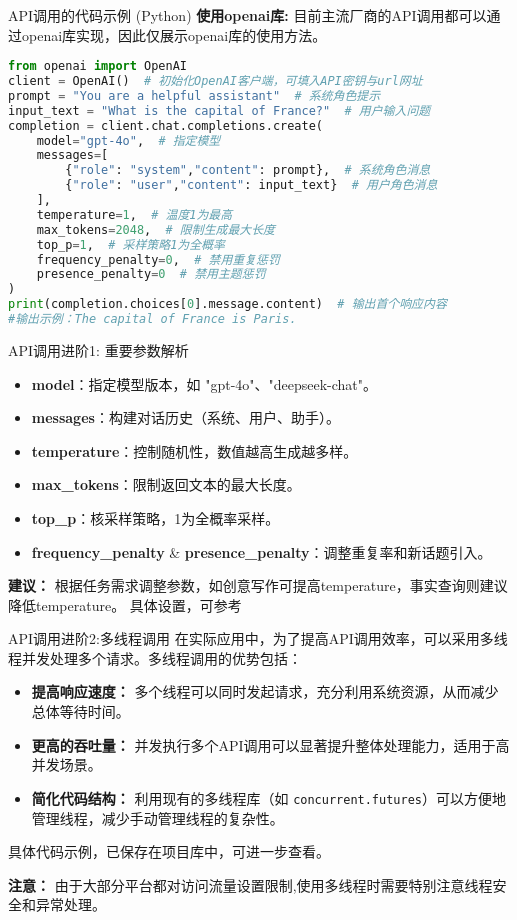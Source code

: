 \documentclass{beamer}
\begin{document}
\begin{frame}[fragile]{API调用的代码示例 (Python)}
    \scriptsize
\textbf{使用openai库:} 目前主流厂商的API调用都可以通过openai库实现，因此仅展示openai库的使用方法。

\begin{lstlisting}[language={Python}]
from openai import OpenAI  
client = OpenAI()  # 初始化OpenAI客户端，可填入API密钥与url网址
prompt = "You are a helpful assistant"  # 系统角色提示
input_text = "What is the capital of France?"  # 用户输入问题
completion = client.chat.completions.create(
    model="gpt-4o",  # 指定模型
    messages=[ 
        {"role": "system","content": prompt},  # 系统角色消息
        {"role": "user","content": input_text}  # 用户角色消息
    ],
    temperature=1,  # 温度1为最高
    max_tokens=2048,  # 限制生成最大长度
    top_p=1,  # 采样策略1为全概率
    frequency_penalty=0,  # 禁用重复惩罚
    presence_penalty=0  # 禁用主题惩罚
)
print(completion.choices[0].message.content)  # 输出首个响应内容
#输出示例：The capital of France is Paris.
\end{lstlisting}
\end{frame}

\begin{frame}[fragile]{API调用进阶1: 重要参数解析}
    \begin{itemize}
        \item \textbf{model}：指定模型版本，如 "gpt-4o"、"deepseek-chat"。
        \item \textbf{messages}：构建对话历史（系统、用户、助手）。
        \item \textbf{temperature}：控制随机性，数值越高生成越多样。
        \item \textbf{max\_tokens}：限制返回文本的最大长度。
        \item \textbf{top\_p}：核采样策略，1为全概率采样。
        \item \textbf{frequency\_penalty} \& \textbf{presence\_penalty}：调整重复率和新话题引入。
    \end{itemize}
    \medskip
    \textbf{建议：} 根据任务需求调整参数，如创意写作可提高temperature，事实查询则建议降低temperature。
    具体设置，可参考
\end{frame}

\begin{frame}[fragile]{API调用进阶2:多线程调用}
\small
    在实际应用中，为了提高API调用效率，可以采用多线程并发处理多个请求。多线程调用的优势包括：
    \begin{itemize}
        \item \textbf{提高响应速度：} 多个线程可以同时发起请求，充分利用系统资源，从而减少总体等待时间。
        \item \textbf{更高的吞吐量：} 并发执行多个API调用可以显著提升整体处理能力，适用于高并发场景。
        \item \textbf{简化代码结构：} 利用现有的多线程库（如 \texttt{concurrent.futures}）可以方便地管理线程，减少手动管理线程的复杂性。
    \end{itemize}
    具体代码示例，已保存在项目库中，可进一步查看。

    \textbf{注意：} 由于大部分平台都对访问流量设置限制,使用多线程时需要特别注意线程安全和异常处理。
\end{frame}
\end{document}
